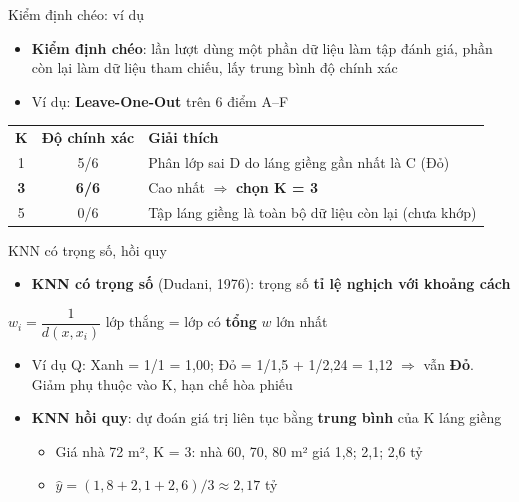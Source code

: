 \documentclass[aspectratio=169,10pt]{beamer}
\newcommand{\hl}[1]{\textcolor{nhan}{\textbf{#1}}}
\newcommand{\hop}[1]{\begin{center}\colorbox{bang}{\parbox{0.92\linewidth}{\centering #1}}\end{center}}
\begin{document}
\begin{frame}{Kiểm định chéo: ví dụ}
\begin{itemize}\setlength\itemsep{0.4em}
  \item \textbf{Kiểm định chéo}: lần lượt dùng một phần dữ liệu làm tập đánh giá, phần còn lại làm dữ liệu tham chiếu, lấy trung bình độ chính xác
  \item Ví dụ: \textbf{Leave-One-Out} trên 6 điểm A--F
\end{itemize}
\vspace{0.2em}
\centering\small
\renewcommand{\arraystretch}{1.3}
\begin{tabular}{ccl}
\rowcolor{bang}\textbf{K} & \textbf{Độ chính xác} & \textbf{Giải thích}\\
1 & 5/6 & Phân lớp sai D do láng giềng gần nhất là C (Đỏ)\\
\hl{3} & \hl{6/6} & Cao nhất $\Rightarrow$ \hl{chọn K = 3}\\
5 & 0/6 & Tập láng giềng là toàn bộ dữ liệu còn lại (chưa khớp)\\
\end{tabular}
\end{frame}

\begin{frame}{KNN có trọng số, hồi quy}
\begin{itemize}\setlength\itemsep{0.45em}
  \item \textbf{KNN có trọng số} (Dudani, 1976): trọng số \hl{tỉ lệ nghịch với khoảng cách}
\end{itemize}
\hop{$w_i = \dfrac{1}{d(x, x_i)}$ \qquad lớp thắng = lớp có \textbf{tổng} $w$ lớn nhất}
\begin{itemize}\setlength\itemsep{0.45em}
  \item Ví dụ Q: Xanh = 1/1 = 1,00; Đỏ = 1/1,5 + 1/2,24 = 1,12 $\Rightarrow$ vẫn \hl{Đỏ}. Giảm phụ thuộc vào K, hạn chế hòa phiếu
  \item \textbf{KNN hồi quy}: dự đoán giá trị liên tục bằng \textbf{trung bình} của K láng giềng
  \begin{itemize}
    \item Giá nhà 72 m², K = 3: nhà 60, 70, 80 m² giá 1,8; 2,1; 2,6 tỷ
    \item $\hat y = (1{,}8 + 2{,}1 + 2{,}6)/3 \approx 2{,}17$ tỷ
  \end{itemize}
\end{itemize}
\end{frame}
\end{document}
